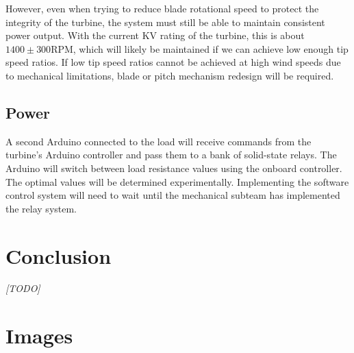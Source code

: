 \documentclass[11pt,letterpaper,conference]{IEEEtran}
\begin{document}
However, even when trying to reduce blade rotational speed to protect the
integrity of the turbine, the system must still be able to maintain
consistent power output. With the current KV rating of the turbine, this is
about $1400 \pm 300$\;RPM, which will likely be maintained if we can achieve
low enough tip speed ratios. If low tip speed ratios cannot be achieved
at high wind speeds due to mechanical limitations, blade or
pitch mechanism redesign will be required.


\subsection{Power}

A second Arduino connected to the load will receive commands from the turbine's
Arduino controller and pass them to a bank of solid-state relays. The
Arduino will switch between load resistance values using the onboard
controller. The optimal values will be determined experimentally. Implementing
the software control system will need to wait until the mechanical subteam has
implemented the relay system.

\section{Conclusion}

\emph{[TODO]}
\balance

\raggedright
\printbibliography

\clearpage
\onecolumn
\appendices
\section{Images}
\label{apx:images}
\end{document}
